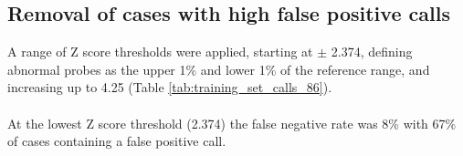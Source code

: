 \begin{table}[]
\centering
\caption[Calls made in 86 training cases]{A very high number of false positive calls was seen in the 86 training cases using a range of Z score thresholds.}
\label{tab:training_set_calls_86}
\end{table}


\subsection{Removal of cases with high false positive calls}
A range of Z score thresholds were applied, starting at $\pm  $ 2.374,  defining abnormal probes as the upper 1\% and lower 1\% of the reference range, and increasing up to 4.25 (Table \ref{tab:training_set_calls_86}).
\paragraph*{}
At the lowest Z score threshold (2.374) the false negative rate was 8\% with 67\% of cases containing a false positive call.
